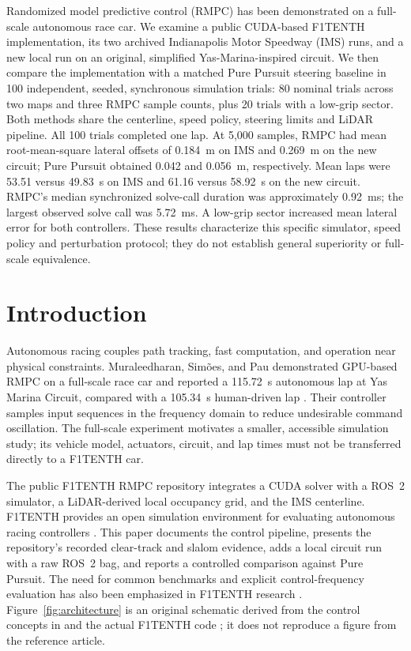 \documentclass{jamris}
\begin{document}
\maketitle

\begin{Abstract}
Randomized model predictive control (RMPC) has been demonstrated on a full-scale autonomous race car. We examine a public CUDA-based F1TENTH implementation, its two archived Indianapolis Motor Speedway (IMS) runs, and a new local run on an original, simplified Yas-Marina-inspired circuit. We then compare the implementation with a matched Pure Pursuit steering baseline in 100 independent, seeded, synchronous simulation trials: 80 nominal trials across two maps and three RMPC sample counts, plus 20 trials with a low-grip sector. Both methods share the centerline, speed policy, steering limits and LiDAR pipeline. All 100 trials completed one lap. At 5,000 samples, RMPC had mean root-mean-square lateral offsets of 0.184~m on IMS and 0.269~m on the new circuit; Pure Pursuit obtained 0.042 and 0.056~m, respectively. Mean laps were 53.51 versus 49.83~s on IMS and 61.16 versus 58.92~s on the new circuit. RMPC's median synchronized solve-call duration was approximately 0.92~ms; the largest observed solve call was 5.72~ms. A low-grip sector increased mean lateral error for both controllers. These results characterize this specific simulator, speed policy and perturbation protocol; they do not establish general superiority or full-scale equivalence.
\end{Abstract}

\section{Introduction}
Autonomous racing couples path tracking, fast computation, and operation near physical constraints. Muraleedharan, Sim\~oes, and Pau demonstrated GPU-based RMPC on a full-scale race car and reported a 115.72~s autonomous lap at Yas Marina Circuit, compared with a 105.34~s human-driven lap \cite{muraleedharan2025racing}. Their controller samples input sequences in the frequency domain to reduce undesirable command oscillation. The full-scale experiment motivates a smaller, accessible simulation study; its vehicle model, actuators, circuit, and lap times must not be transferred directly to a F1TENTH car.

The public F1TENTH RMPC repository \cite{mulakaloori2026repo} integrates a CUDA solver with a ROS~2 simulator, a LiDAR-derived local occupancy grid, and the IMS centerline. F1TENTH provides an open simulation environment for evaluating autonomous racing controllers \cite{okelly2020f1tenth}. This paper documents the control pipeline, presents the repository's recorded clear-track and slalom evidence, adds a local circuit run with a raw ROS~2 bag, and reports a controlled comparison against Pure Pursuit. The need for common benchmarks and explicit control-frequency evaluation has also been emphasized in F1TENTH research \cite{evans2024benchmarks}. Figure~\ref{fig:architecture} is an original schematic derived from the control concepts in \cite{muraleedharan2025racing} and the actual F1TENTH code \cite{mulakaloori2026repo}; it does not reproduce a figure from the reference article.
\end{document}

